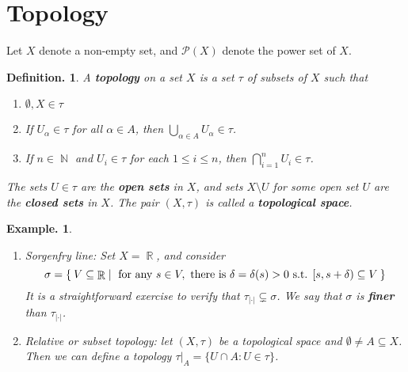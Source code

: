 \documentclass[11pt, a4paper]{memoir}
\DeclareMathOperator{\N}{{\mathbb{N}}}
\DeclareMathOperator{\R}{{\mathbb{R}}}
\newcommand{\abs}[1]{\ensuremath{\left\lvert#1\right\rvert}}
\theoremstyle{change}
\theoremstyle{plain}
\theoremstyle{nonumberplain}
\newtheorem{definition}{Definition.}
\newtheorem{example}{Example.}
\numberwithin{equation}{section}
\begin{document}
\section{Topology}
Let $X$ denote a non-empty set, and $\mathcal{P}(X)$ denote the power set of $X$.
\begin{definition}
    A \textbf{topology} on a set $X$ is a set $\tau$ of subsets of $X$ such that
    \begin{enumerate}[nl,r]
        \item $\emptyset,X\in\tau$
        \item If $U_\alpha\in\tau$ for all $\alpha\in A$, then $\bigcup_{\alpha\in A}U_\alpha\in\tau$.
        \item If $n\in\N$ and $U_i\in\tau$ for each $1\leq i\leq n$, then $\bigcap_{i=1}^n U_i\in\tau$.
    \end{enumerate}
    The sets $U\in\tau$ are the \textbf{open sets} in $X$, and sets $X\setminus U$ for some open set $U$ are the \textbf{closed sets} in $X$.
    The pair $(X,\tau)$ is called a \textbf{topological space}.
\end{definition}
\begin{example}
    \begin{enumerate}[nl,r]
        \item \textit{Sorgenfry line:}
            Set $X=\R$, and consider
            \begin{equation*}
                \sigma=\Set{V\subseteq\R | \text{ for any }s\in V,\text{ there is }\delta=\delta(s)>0\text{ s.t. }[s,s+\delta)\subseteq V}
            \end{equation*}
            It is a straightforward exercise to verify that $\tau_{\abs{\cdot}}\subsetneq\sigma$.
            We say that $\sigma$ is \textbf{finer} than $\tau_{\abs{\cdot}}$.
        \item \textit{Relative or subset topology}: let $(X,\tau)$ be a topological space and $\emptyset\neq A\subseteq X$.
            Then we can define a topology $\tau|_A=\{U\cap A:U\in\tau\}$.
    \end{enumerate}
\end{example}
\end{document}
